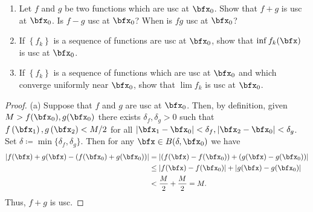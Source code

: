 \begin{problem}
\begin{enumerate}[label=(\alph*)]
\item Let $f$ and $g$ be two functions which are usc at $\bfx_0$. Show that
  $f+g$ is usc at $\bfx_0$. Is $f-g$ usc at $\bfx_0$? When is $fg$ usc at
  $\bfx_0$?
\item If $\left\{f_k\right\}$ is a sequence of functions are usc at
  $\bfx_0$, show that $\inf f_k(\bfx)$ is usc at $\bfx_0$.
\item If $\left\{f_k\right\}$ is a sequence of functions which are usc at
  $\bfx_0$ and which converge uniformly near $\bfx_0$, show that $\lim f_k$
  is usc at $\bfx_0$.
\end{enumerate}
\end{problem}
\begin{proof}
(a) Suppose that $f$ and $g$ are usc at $\bfx_0$. Then, by definition,
given $M>f(\bfx_0),g(\bfx_0)$ there exists $\delta_f,\delta_g>0$ such that
$f\left(\bfx_1\right),g\left(\bfx_2\right)<M/2$ for all
$\left|\bfx_1-\bfx_0\right|<\delta_f,\left|\bfx_2-\bfx_0\right|<\delta_g$. Set
$\delta\coloneqq\min\{\delta_f,\delta_g\}$. Then for any $\bfx\in
B(\delta,\bfx_0)$ we have
\begin{align*}
\left|f(\bfx)+g(\bfx)-\left(f(\bfx_0)+g(\bfx_0)\right)\right|
&=\left|\left(f(\bfx)-f(\bfx_0)\right)+\left(g(\bfx)-g(\bfx_0)\right)\right|\\
&\leq\left|f(\bfx)-f(\bfx_0)\right|+\left|g(\bfx)-g(\bfx_0)\right|\\
&<\frac{M}{2}+\frac{M}{2}=M.
\end{align*}
Thus, $f+g$ is usc.


\end{proof}
